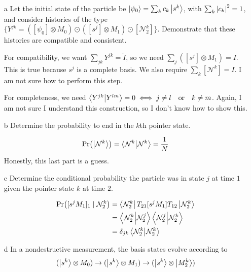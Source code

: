 \documentclass[a4paper,twoside]{article}
\begin{document}
\begin{itemize}
    \item[a] Let the initial state of the particle be $ \ket{\psi_0} = \sum_k c_k \ket{s^k} $, with $ \sum_k \abs{c_k}^2 = 1 $, and consider histories of the type $ \{Y^{jk} = ([\psi_0] \otimes M_0) \odot ([s^j] \otimes M_1) \odot [\mathcal{N}_2^k]\} $. Demonstrate that these histories are compatible and consistent.
        \begin{tcolorbox}[breakable]
            For compatibility, we want $ \sum_{jk} Y^{jk} = \tilde{I} $, so we need $ \sum_j ([s^j] \otimes M_1) = I $. This is true because $ s^j $ is a complete basis. We also require $ \sum_k [\mathcal{N}^k] = I $. I am not sure how to perform this step.

            For completeness, we need $ \bra{Y^{jk}} \ket{Y^{lm}} = 0 \iff j \neq l \qor k \neq m$. Again, I am not sure I understand this construction, so I don't know how to show this.
        \end{tcolorbox}
    \item[b] Determine the probability to end in the $ k $th pointer state.
        \begin{tcolorbox}[breakable]
            \begin{equation}
                \Pr(\ket{\mathcal{N}^k}) = \bra{\mathcal{N}^k} \ket{\mathcal{N}^k} = \frac{1}{N}
            \end{equation}
            Honestly, this last part is a guess.
        \end{tcolorbox}
    \item[c] Determine the conditional probability the particle was in state $ j $ at time $ 1 $ given the pointer state $ k $ at time $ 2 $.
        \begin{tcolorbox}[breakable]
            \begin{align}
                \Pr([s^j M_1]_1\mid\mathcal{N}_2^k) &= \bra{\mathcal{N}_2^k} T_{21}[s^j M_1]T_{12} \ket{\mathcal{N}_2^k}\\
                &= \bra{\mathcal{N}_2^k} \ket{\mathcal{N}_2^j} \bra{\mathcal{N}_2^j} \ket{\mathcal{N}_2^k}\\
                &= \delta_{jk} \ip{\mathcal{N}_2^k}
            \end{align}
        \end{tcolorbox}
    \item[d] In a nondestructive measurement, the basis states evolve according to
        \begin{equation}
            (\ket{s^k} \otimes M_0) \to (\ket{s^k} \otimes M_1) \to (\ket{s^k} \otimes \ket{M_2^k})

\end{equation}
\end{itemize}
\end{document}
